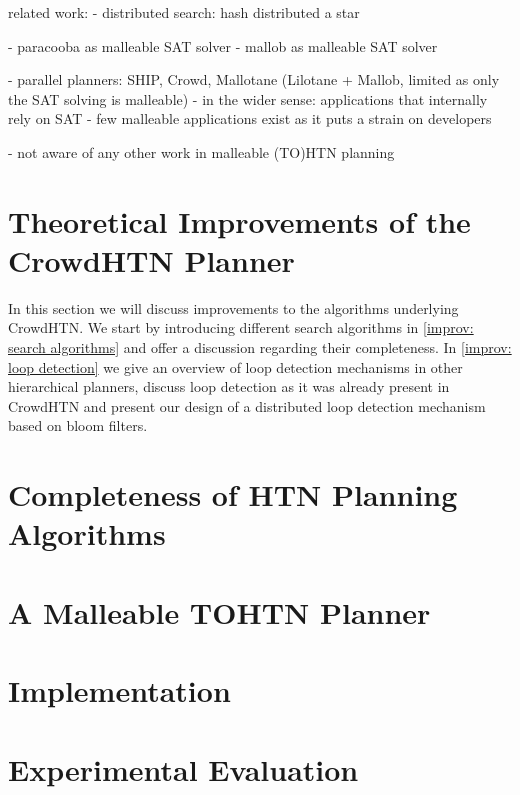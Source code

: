 \documentclass[enabledeprecatedfontcommands,12pt,a4paper,twoside]{scrartcl}
\numberwithin{equation}{section}
\begin{document}






related work:
- distributed search: hash distributed a star

- paracooba as malleable SAT solver
- mallob as malleable SAT solver

- parallel planners: SHIP, Crowd, Mallotane (Lilotane + Mallob, limited as only the SAT solving is malleable)
- in the wider sense: applications that internally rely on SAT
- few malleable applications exist as it puts a strain on developers

- not aware of any other work in malleable (TO)HTN planning

\pagebreak
\section{Theoretical Improvements of the CrowdHTN Planner}
In this section we will discuss improvements to the algorithms underlying CrowdHTN. We start by introducing different search algorithms in \ref{improv: search algorithms} and offer a discussion regarding their completeness. In \ref{improv: loop detection} we give an overview of loop detection mechanisms in other hierarchical planners, discuss loop detection as it was already present in CrowdHTN and present our design of a distributed loop detection mechanism based on bloom filters.



\pagebreak
\section{Completeness of HTN Planning Algorithms}
\label{improv: completeness}


\pagebreak
\section{A Malleable TOHTN Planner}


\pagebreak
\section{Implementation}



\pagebreak
\section{Experimental Evaluation}
\end{document}
